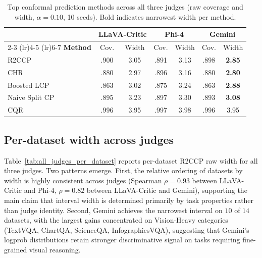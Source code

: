 \documentclass{article}
\begin{document}
\begin{table}[t]
\centering
\caption{Top conformal prediction methods across all three judges (raw coverage and width, $\alpha = 0.10$, 10 seeds). Bold indicates narrowest width per method.}
\label{tab:all_methods_all_judges}
\small
\begin{tabular}{lcccccc}
\toprule
& \multicolumn{2}{c}{\textbf{LLaVA-Critic}} & \multicolumn{2}{c}{\textbf{Phi-4}} & \multicolumn{2}{c}{\textbf{Gemini}} \\
\cmidrule(lr){2-3} \cmidrule(lr){4-5} \cmidrule(lr){6-7}
\textbf{Method} & Cov. & Width & Cov. & Width & Cov. & Width \\
\midrule
R2CCP & .900 & 3.05 & .891 & 3.13 & .898 & \textbf{2.85} \\
CHR & .880 & 2.97 & .896 & 3.16 & .880 & \textbf{2.80} \\
Boosted LCP & .863 & 3.02 & .875 & 3.24 & .863 & \textbf{2.88} \\
Naive Split CP & .895 & 3.23 & .897 & 3.30 & .893 & \textbf{3.08} \\
CQR & .996 & 3.95 & .997 & 3.98 & .996 & 3.95 \\
\bottomrule
\end{tabular}
\end{table}

\subsection{Per-dataset width across judges}

Table~\ref{tab:all_judges_per_dataset} reports per-dataset R2CCP raw width for all three judges. Two patterns emerge. First, the relative ordering of datasets by width is highly consistent across judges (Spearman $\rho = 0.93$ between LLaVA-Critic and Phi-4, $\rho = 0.82$ between LLaVA-Critic and Gemini), supporting the main claim that interval width is determined primarily by task properties rather than judge identity. Second, Gemini achieves the narrowest interval on $10$ of $14$ datasets, with the largest gains concentrated on Vision-Heavy categories (TextVQA, ChartQA, ScienceQA, InfographicsVQA), suggesting that Gemini's logprob distributions retain stronger discriminative signal on tasks requiring fine-grained visual reasoning.
\end{document}
